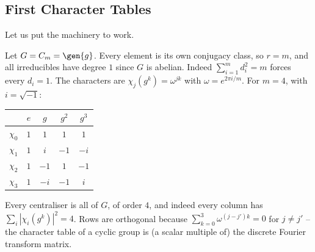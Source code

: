 \subsection{First Character Tables}

Let us put the machinery to work.

\begin{example}
	Let $G = C_m = \gen{g}$. Every element is its own conjugacy class, so $r = m$, and all irreducibles have degree $1$ since $G$ is abelian. Indeed $\sum_{i=1}^m d_i^2 = m$ forces every $d_i = 1$. The characters are $\chi_j(g^k) = \omega^{jk}$ with $\omega = e^{2\pi i/m}$. For $m = 4$, with $i = \sqrt{-1}$:
	\begin{center}
	\renewcommand{\arraystretch}{1.25}
	\setlength{\tabcolsep}{9pt}
	\begin{tabular}{c|cccc}
	\toprule
	 & $e$ & $g$ & $g^2$ & $g^3$\\
	\midrule
	$\chi_0$ & $1$ & $1$ & $1$ & $1$\\
	$\chi_1$ & $1$ & $i$ & $-1$ & $-i$\\
	$\chi_2$ & $1$ & $-1$ & $1$ & $-1$\\
	$\chi_3$ & $1$ & $-i$ & $-1$ & $i$\\
	\bottomrule
	\end{tabular}
	\end{center}
	Every centraliser is all of $G$, of order $4$, and indeed every column has $\sum_i|\chi_i(g^k)|^2 = 4$. Rows are orthogonal because $\sum_{k=0}^3 \omega^{(j - j')k} = 0$ for $j \neq j'$ -- the character table of a cyclic group is (a scalar multiple of) the discrete Fourier transform matrix.
\end{example}

